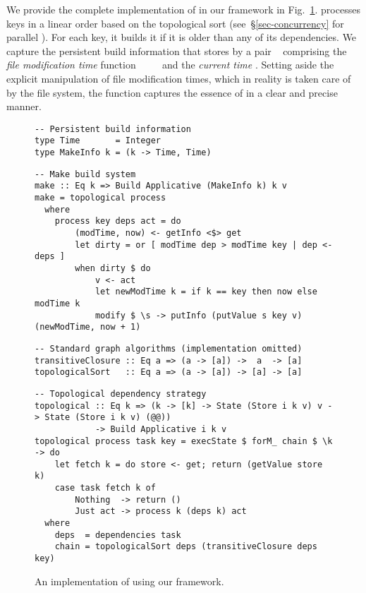 We provide the complete implementation of \Make in our framework in
Fig.~\ref{fig-make-implementation}. \Make processes keys in a linear order based
on the topological sort (see~\S\ref{sec-concurrency} for parallel \Make). For
each key, it builds it if it is older than any of its dependencies. We capture
the persistent build information that \Make stores by a pair
~ comprising the \emph{file modification time} function
~\hs{::}~~\hs{->}~ and the \emph{current time} .
Setting aside the explicit manipulation of file modification times, which in
reality is taken care of by the file system, the function  captures
the essence of \Make in a clear and precise manner.

\begin{figure}
\begin{verbatim}
-- Persistent build information
type Time       = Integer
type MakeInfo k = (k -> Time, Time)
\end{verbatim}
\vspace{1mm}
\begin{verbatim}
-- Make build system
make :: Eq k => Build Applicative (MakeInfo k) k v
make = topological process
  where
    process key deps act = do
        (modTime, now) <- getInfo <$> get
        let dirty = or [ modTime dep > modTime key | dep <- deps ]
        when dirty $ do
            v <- act
            let newModTime k = if k == key then now else modTime k
            modify $ \s -> putInfo (putValue s key v) (newModTime, now + 1)
\end{verbatim}
\vspace{1mm}
\begin{verbatim}
-- Standard graph algorithms (implementation omitted)
transitiveClosure :: Eq a => (a -> [a]) ->  a  -> [a]
topologicalSort   :: Eq a => (a -> [a]) -> [a] -> [a]
\end{verbatim}
\vspace{1mm}
\begin{verbatim}
-- Topological dependency strategy
topological :: Eq k => (k -> [k] -> State (Store i k v) v -> State (Store i k v) (@@))
            -> Build Applicative i k v
topological process task key = execState $ forM_ chain $ \k -> do
    let fetch k = do store <- get; return (getValue store k)
    case task fetch k of
        Nothing  -> return ()
        Just act -> process k (deps k) act
  where
    deps  = dependencies task
    chain = topologicalSort deps (transitiveClosure deps key)
\end{verbatim}
\vspace{-2mm}
\caption{An implementation of \Make using our framework.}\label{fig-make-implementation}
\vspace{-2mm}
\end{figure}

